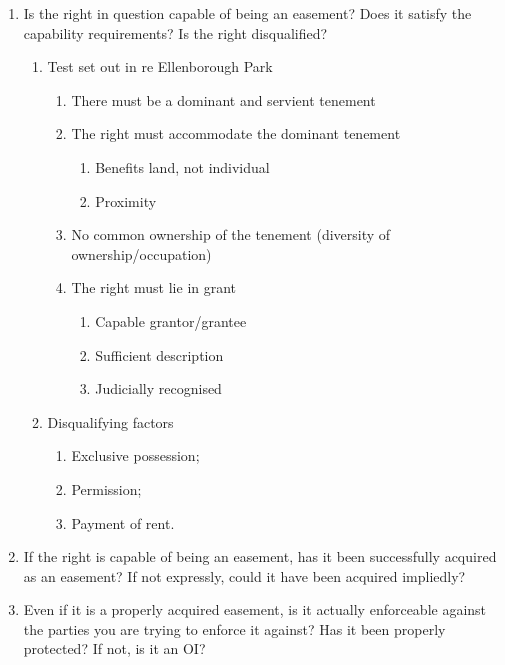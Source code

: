 \documentclass[
]{article}
\providecommand{\tightlist}{%
  \setlength{\itemsep}{0pt}\setlength{\parskip}{0pt}}
\begin{document}
\begin{enumerate}
\def\labelenumi{\arabic{enumi}.}
\tightlist
\item
  Is the right in question capable of being an easement? Does it satisfy
  the capability requirements? Is the right disqualified?

  \begin{enumerate}
  \def\labelenumii{\arabic{enumii}.}
  \tightlist
  \item
    Test set out in re Ellenborough Park

    \begin{enumerate}
    \def\labelenumiii{\arabic{enumiii}.}
    \tightlist
    \item
      There must be a dominant and servient tenement
    \item
      The right must accommodate the dominant tenement

      \begin{enumerate}
      \def\labelenumiv{\arabic{enumiv}.}
      \tightlist
      \item
        Benefits land, not individual
      \item
        Proximity
      \end{enumerate}
    \item
      No common ownership of the tenement (diversity of
      ownership/occupation)
    \item
      The right must lie in grant

      \begin{enumerate}
      \def\labelenumiv{\arabic{enumiv}.}
      \tightlist
      \item
        Capable grantor/grantee
      \item
        Sufficient description
      \item
        Judicially recognised
      \end{enumerate}
    \end{enumerate}
  \item
    Disqualifying factors

    \begin{enumerate}
    \def\labelenumiii{\arabic{enumiii}.}
    \tightlist
    \item
      Exclusive possession;
    \item
      Permission;
    \item
      Payment of rent.
    \end{enumerate}
  \end{enumerate}
\item
  If the right is capable of being an easement, has it been successfully
  acquired as an easement? If not expressly, could it have been acquired
  impliedly?
\item
  Even if it is a properly acquired easement, is it actually enforceable
  against the parties you are trying to enforce it against? Has it been
  properly protected? If not, is it an OI?
\end{enumerate}
\end{document}

